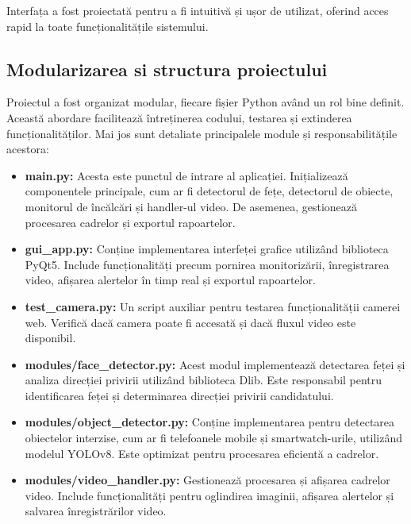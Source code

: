 \documentclass[12pt,a4paper]{article}
\begin{document}
Interfața a fost proiectată pentru a fi intuitivă și ușor de utilizat, oferind acces rapid la toate funcționalitățile sistemului.

\subsection{Modularizarea si structura proiectului}

\hspace{6mm}Proiectul a fost organizat modular, fiecare fișier Python având un rol bine definit. Această abordare facilitează întreținerea codului, testarea și extinderea funcționalităților. Mai jos sunt detaliate principalele module și responsabilitățile acestora:

\begin{itemize}
    \item \textbf{main.py:} Acesta este punctul de intrare al aplicației. Inițializează componentele principale, cum ar fi detectorul de fețe, detectorul de obiecte, monitorul de încălcări și handler-ul video. De asemenea, gestionează procesarea cadrelor și exportul rapoartelor.

    \item \textbf{gui\_app.py:} Conține implementarea interfeței grafice utilizând biblioteca PyQt5. Include funcționalități precum pornirea monitorizării, înregistrarea video, afișarea alertelor în timp real și exportul rapoartelor.
    
    \item \textbf{test\_camera.py:} Un script auxiliar pentru testarea funcționalității camerei web. Verifică dacă camera poate fi accesată și dacă fluxul video este disponibil.

    \item \textbf{modules/face\_detector.py:} Acest modul implementează detectarea feței și analiza direcției privirii utilizând biblioteca Dlib. Este responsabil pentru identificarea feței și determinarea direcției privirii candidatului.

    \item \textbf{modules/object\_detector.py:} Conține implementarea pentru detectarea obiectelor interzise, cum ar fi telefoanele mobile și smartwatch-urile, utilizând modelul YOLOv8. Este optimizat pentru procesarea eficientă a cadrelor.

    \item \textbf{modules/video\_handler.py:} Gestionează procesarea și afișarea cadrelor video. Include funcționalități pentru oglindirea imaginii, afișarea alertelor și salvarea înregistrărilor video.


\end{itemize}
\end{document}
